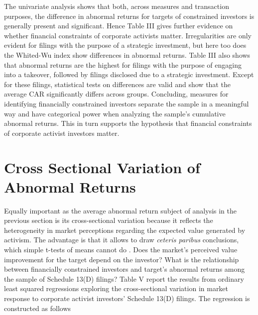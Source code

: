 \documentclass[12pt]{article}
\begin{document}
The univariate analysis shows that both, across measures and transaction purposes, the difference in abnormal returns for targets of constrained investors is generally present and significant. Hence Table III gives further evidence on whether financial constraints of corporate activists matter. Irregularities are only evident for filings with the purpose of a strategic investment, but here too does the Whited-Wu index show differences in abnormal returns. 
Table III also shows that abnormal returns are the highest for filings with the purpose of engaging into a takeover, followed by filings disclosed due to a strategic investment. Except for these filings, statistical tests on differences are valid and show that the average CAR significantly differs across groups. Concluding, measures for identifying financially constrained investors separate the sample in a meaningful way and have categorical power when analyzing the sample's cumulative abnormal returns. This in turn supports the hypothesis that financial constraints of corporate activist investors matter. 

\section{Cross Sectional Variation of Abnormal Returns}

Equally important as the average abnormal return subject of analysis in the previous section is its cross-sectional variation because it reflects the heterogeneity in market perceptions regarding the expected value generated by activism. The advantage is that it allows to draw \emph{ceteris paribus} conclusions, which simple t-tests of means cannot do \citep[p.111]{Khatami2014}. Does the market's perceived value improvement for the target depend on the investor? What is the relationship between financially constrained investors and target's abnormal returns among the sample of Schedule 13(D) filings?
Table V report the results from ordinary least squared regressions exploring the cross-sectional variation in market response to corporate activist investors' Schedule 13(D) filings. The regression is constructed as follows 
\end{document}
